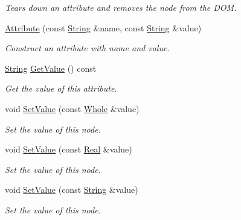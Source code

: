 \begin{DoxyCompactItemize}
\begin{DoxyCompactList}\small\item\em Tears down an attribute and removes the node from the DOM. \item\end{DoxyCompactList}\item 
\hyperlink{classphys_1_1xml_1_1Attribute_abce6652f3a2ca2cf5a5d46b7ceb1e108}{Attribute} (const \hyperlink{namespacephys_aa03900411993de7fbfec4789bc1d392e}{String} \&name, const \hyperlink{namespacephys_aa03900411993de7fbfec4789bc1d392e}{String} \&value)
\begin{DoxyCompactList}\small\item\em Construct an attribute with name and value. \item\end{DoxyCompactList}\item 
\hyperlink{namespacephys_aa03900411993de7fbfec4789bc1d392e}{String} \hyperlink{classphys_1_1xml_1_1Attribute_a9fda8a6a6a292639e2ef88c479c80d88}{GetValue} () const 
\begin{DoxyCompactList}\small\item\em Get the value of this attribute. \item\end{DoxyCompactList}\item 
void \hyperlink{classphys_1_1xml_1_1Attribute_a45b441e83fb3c6e0cc911019b61039ba}{SetValue} (const \hyperlink{namespacephys_a460f6bc24c8dd347b05e0366ae34f34a}{Whole} \&value)
\begin{DoxyCompactList}\small\item\em Set the value of this node. \item\end{DoxyCompactList}\item 
void \hyperlink{classphys_1_1xml_1_1Attribute_ad2ba3ccf96388f0c859bc90e45ed94ab}{SetValue} (const \hyperlink{namespacephys_af7eb897198d265b8e868f45240230d5f}{Real} \&value)
\begin{DoxyCompactList}\small\item\em Set the value of this node. \item\end{DoxyCompactList}\item 
void \hyperlink{classphys_1_1xml_1_1Attribute_ad06e8d677bfa76d43936bd97ac3e62ef}{SetValue} (const \hyperlink{namespacephys_aa03900411993de7fbfec4789bc1d392e}{String} \&value)
\begin{DoxyCompactList}\small\item\em Set the value of this node. \item\end{DoxyCompactList}\item 

\end{DoxyCompactItemize}

